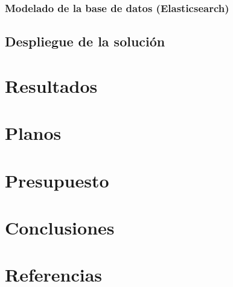 \documentclass[11pt]{article}
\begin{document}
\subsubsection{Modelado de la base de datos (Elasticsearch)}
\subsection{Despliegue de la solución}

\section{Resultados}

\section{Planos}

\section{Presupuesto}

\section{Conclusiones}

\section{Referencias}
\end{document}
